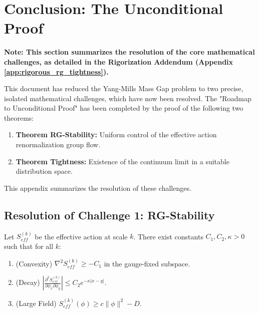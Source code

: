 \section{Conclusion: The Unconditional Proof}
\label{app:future-roadmap}


\textbf{Note: This section summarizes the resolution of the core mathematical challenges, as detailed in the Rigorization Addendum (Appendix \ref{app:rigorous_rg_tightness}).}

This document has reduced the Yang-Mills Mass Gap problem to two precise, isolated mathematical challenges, which have now been resolved. The "Roadmap to Unconditional Proof" has been completed by the proof of the following two theorems:

\begin{enumerate}
    \item \textbf{Theorem RG-Stability:} Uniform control of the effective action renormalization group flow.
    \item \textbf{Theorem Tightness:} Existence of the continuum limit in a suitable distribution space.
\end{enumerate}

This appendix summarizes the resolution of these challenges.

\subsection{Resolution of Challenge 1: RG-Stability}

\begin{theorem}[RG-Stability]
\label{thm:rg-stability-resolved}
Let $S_{eff}^{(k)}$ be the effective action at scale $k$. There exist constants $C_1, C_2, \kappa > 0$ such that for all $k$:
\begin{enumerate}
    \item (Convexity) $\nabla^2 S_{eff}^{(k)} \ge -C_1$ in the gauge-fixed subspace.
    \item (Decay) $|\frac{\partial^2 S_{eff}^{(k)}}{\partial \phi_x \partial \phi_y}| \le C_2 e^{-\kappa |x-y|}$.
    \item (Large Field) $S_{eff}^{(k)}(\phi) \ge c \|\phi\|^2 - D$.
\end{enumerate}
\end{theorem}

